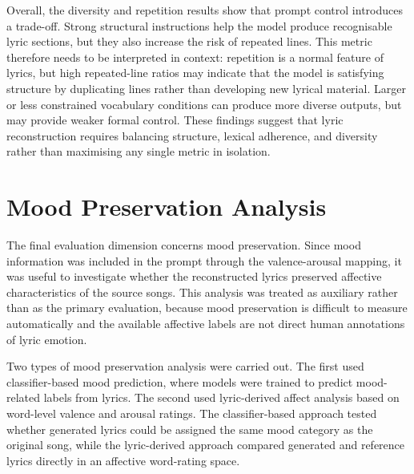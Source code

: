 Overall, the diversity and repetition results show that prompt control introduces a trade-off. Strong structural instructions help the model produce recognisable lyric sections, but they also increase the risk of repeated lines. This metric therefore needs to be interpreted in context: repetition is a normal feature of lyrics, but high repeated-line ratios may indicate that the model is satisfying structure by duplicating lines rather than developing new lyrical material. Larger or less constrained vocabulary conditions can produce more diverse outputs, but may provide weaker formal control. These findings suggest that lyric reconstruction requires balancing structure, lexical adherence, and diversity rather than maximising any single metric in isolation.


\section{Mood Preservation Analysis}

The final evaluation dimension concerns mood preservation. Since mood information was included in the prompt through the valence-arousal mapping, it was useful to investigate whether the reconstructed lyrics preserved affective characteristics of the source songs. This analysis was treated as auxiliary rather than as the primary evaluation, because mood preservation is difficult to measure automatically and the available affective labels are not direct human annotations of lyric emotion.

Two types of mood preservation analysis were carried out. The first used classifier-based mood prediction, where models were trained to predict mood-related labels from lyrics. The second used lyric-derived affect analysis based on word-level valence and arousal ratings. The classifier-based approach tested whether generated lyrics could be assigned the same mood category as the original song, while the lyric-derived approach compared generated and reference lyrics directly in an affective word-rating space.

